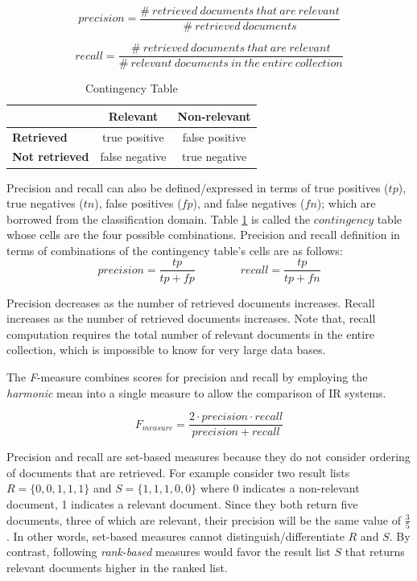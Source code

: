 \begin{equation}\label{precision}
precision = \frac{\#\ retrieved\ documents\ that\ are\ relevant}{\#\ retrieved\ documents}
\end{equation}

\begin{equation}\label{recall}
recall = \frac{\#\ retrieved\ documents\ that\ are\ relevant}{\#\ relevant\ documents\ in\ the\ entire\ collection}
\end{equation}

\begin{table}
\caption{Contingency Table}
\label{tbl:con}
\begin{tabular}{ l | c | c }
   &  \bfseries Relevant & \bfseries Non-relevant \\
\hline 
\bfseries Retrieved & true positive & false positive \\
\bfseries Not retrieved & false negative & true negative \\
\end{tabular}
\end{table}

Precision and recall can also be defined/expressed in terms of true positives ($tp$), true negatives ($tn$), false positives ($fp$), and false negatives ($fn$); which are borrowed from the classification domain.
Table \ref{tbl:con} is called the $contingency$ table whose cells are the four possible combinations.
Precision and recall definition in terms of combinations of the contingency table's cells are as follows:
\begin{equation}\label{pr}
precision = \frac{tp}{tp+fp} \qquad  \qquad recall =\frac{tp}{tp+fn}
\end{equation}

Precision decreases as the number of retrieved documents increases.
Recall increases as the number of retrieved documents increases.
Note that, recall computation requires the total number of relevant documents in the entire collection, which is impossible to know for very large data bases.


The \emph{F}-measure combines scores for precision and recall by employing the \emph{harmonic} mean into a single measure to allow the comparison of IR systems.

\begin{equation}\label{fm}
F_{measure} = \frac{2 \cdot precision \cdot recall}{precision + recall}
\end{equation}


Precision and recall are set-based measures because they do not consider ordering of documents that are retrieved.
For example consider two result lists $R = \{0,0,1,1,1\}$ and $S = \{1,1,1,0,0\}$ where 0 indicates a non-relevant document, 1 indicates a relevant document.
Since they both return five documents, three of which are relevant, their precision will be the same value of $\frac{3}{5}$.
In other words, set-based measures cannot distinguish/differentiate $R$ and $S$.
By contrast, following \emph{rank-based} measures would favor the result list $S$ that returns relevant documents higher in the ranked list.


